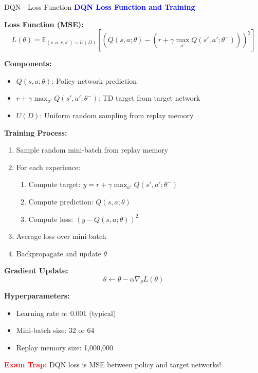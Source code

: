 \documentclass[8pt]{beamer}
\begin{document}
\begin{frame}{DQN - Loss Function}
\fontsize{6.5}{7.5}\selectfont
\textcolor{blue}{\textbf{DQN Loss Function and Training}}

\textbf{Loss Function (MSE):}
\[
L(\theta) = \mathbb{E}_{(s,a,r,s') \sim U(D)}[(Q(s,a;\theta) - (r + \gamma \max_{a'} Q(s',a';\theta^-)))^2]
\]

\textbf{Components:}
\begin{itemize}
\item $Q(s,a;\theta)$: Policy network prediction
\item $r + \gamma \max_{a'} Q(s',a';\theta^-)$: TD target from target network
\item $U(D)$: Uniform random sampling from replay memory
\end{itemize}

\textbf{Training Process:}
\begin{enumerate}
\item Sample random mini-batch from replay memory
\item For each experience:
\begin{enumerate}
\item Compute target: $y = r + \gamma \max_{a'} Q(s',a';\theta^-)$
\item Compute prediction: $Q(s,a;\theta)$
\item Compute loss: $(y - Q(s,a;\theta))^2$
\end{enumerate}
\item Average loss over mini-batch
\item Backpropagate and update $\theta$
\end{enumerate}

\textbf{Gradient Update:}
\[
\theta \leftarrow \theta - \alpha \nabla_\theta L(\theta)
\]

\textbf{Hyperparameters:}
\begin{itemize}
\item Learning rate $\alpha$: 0.001 (typical)
\item Mini-batch size: 32 or 64
\item Replay memory size: 1,000,000
\end{itemize}

\textcolor{red}{\textbf{Exam Trap:}} DQN loss is MSE between policy and target networks!
\end{frame}
\end{document}
